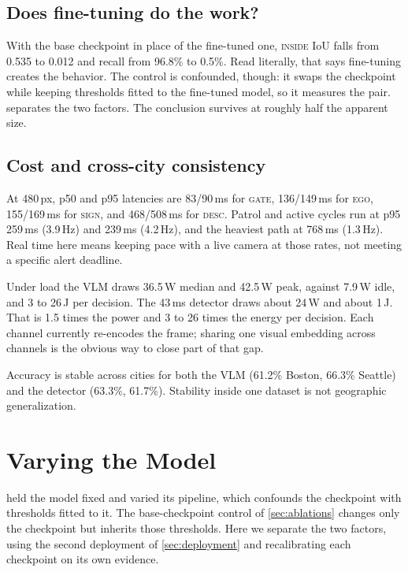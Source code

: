 \documentclass[journal]{IEEEtran}
\newcommand{\st}[1]{\textsc{#1}}
\begin{document}
\subsection{Does fine-tuning do the work?}
With the base checkpoint in place of the fine-tuned one, \st{inside} IoU falls from 0.535 to 0.012 and recall from 96.8\% to 0.5\%.  Read literally, that says fine-tuning creates the behavior.  The control is confounded, though: it swaps the checkpoint while keeping thresholds fitted to the fine-tuned model, so it measures the pair.   separates the two factors.  The conclusion survives at roughly half the apparent size.

\subsection{Cost and cross-city consistency}
\label{sec:cost}

At 480\,px, p50 and p95 latencies are 83/90\,ms for \st{gate}, 136/149\,ms for \st{ego}, 155/169\,ms for \st{sign}, and 468/508\,ms for \st{desc}.  Patrol and active cycles run at p95 259\,ms (3.9\,Hz) and 239\,ms (4.2\,Hz), and the heaviest path at 768\,ms (1.3\,Hz).  Real time here means keeping pace with a live camera at those rates, not meeting a specific alert deadline.

Under load the VLM draws 36.5\,W median and 42.5\,W peak, against 7.9\,W idle, and 3 to 26\,J per decision.  The 43\,ms detector draws about 24\,W and about 1\,J.  That is 1.5 times the power and 3 to 26 times the energy per decision. Each channel currently re-encodes the frame; sharing one visual embedding across channels is the obvious way to close part of that gap.

Accuracy is stable across cities for both the VLM (61.2\% Boston, 66.3\% Seattle) and the detector (63.3\%, 61.7\%).  Stability inside one dataset is not geographic generalization.

\section{Varying the Model}
\label{sec:worldmodel}

 held the model fixed and varied its pipeline, which confounds the checkpoint with thresholds fitted to it.  The base-checkpoint control of \cref{sec:ablations} changes only the checkpoint but inherits those thresholds. Here we separate the two factors, using the second deployment of \cref{sec:deployment} and recalibrating each checkpoint on its own evidence.
\end{document}
